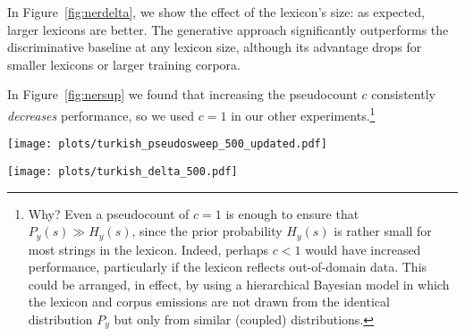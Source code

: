 \documentclass[11pt]{article}
\begin{document}
 In Figure~\ref{fig:nerdelta}, we show the effect of the lexicon's size: as expected, larger lexicons are better.  The generative approach significantly outperforms the discriminative baseline at any lexicon size, although its advantage drops for smaller lexicons or larger training corpora.  

In Figure~\ref{fig:nersup} we found that increasing the pseudocount $c$ consistently \emph{decreases} performance, so we used $c=1$ in our other experiments.\footnote{Why?  Even a pseudocount of $c=1$ is enough to ensure that $P_y(s) \gg H_y(s)$, since the prior probability $H_y(s)$ is rather small for most strings in the lexicon.  Indeed, perhaps $c < 1$ would have increased performance, particularly if the lexicon reflects out-of-domain data.  This could be arranged, in effect, by using a hierarchical Bayesian model in which the lexicon and corpus emissions are not drawn from the identical distribution $P_y$ but only from similar (coupled) distributions.}

\begin{figure*}
  \centering
  \texttt{[image: plots/turkish\_pseudosweep\_500\_updated.pdf]}
  \caption{\textbf{Absolute} NER performance for Turkish ($y$-axis) as a function of corpus size ($x$-axis).  The $y$-axis gives the F1 score on a held-out evaluation set (averaged over 10 bootstrap replicates, with error bars showing 95\% confidence intervals).  Our generative approach is compared to a baseline discriminative model with lexicon features (lowest curve).  500 held-out sentences were used to create the lexicon for both methods.  Note that increasing the pseudocount $c$ for lexicon entries (upper curves) tends to \emph{decrease} performance for the generative model; we therefore take $c=1$ in all other experiments.  This graph shows Turkish; the corresponding Uzbek figure is available as supplementary material.}\label{fig:nersup}
\end{figure*}

\begin{figure*}
  \centering
  \texttt{[image: plots/turkish\_delta\_500.pdf]}
  \caption{\textbf{Relative} NER performance for Turkish ($y$-axis) as a function of corpus size ($x$-axis).  In this graph, $c=1$ is constant and the curves instead compare different lexicon sizes derived from 10, 100, and 1000 held-out sentences.  
    The $y$-axis now gives the \emph{difference}
    $\text{F1}_{\text{model}} - \text{F1}_{\text{baseline}}$, so 
    positive values indicate \emph{improvement over the baseline} due to
    the proposed model.  Gains are highest for large lexicons and for small corpora.
    Again, the corresponding Uzbek figure is available as supplementary material.}\label{fig:nerdelta}
\end{figure*}
\end{document}
